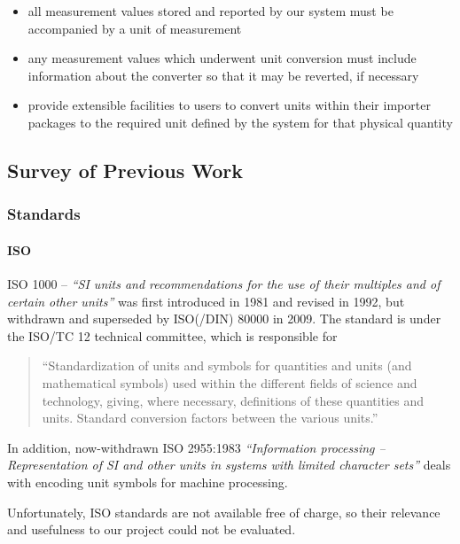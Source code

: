 \begin{itemize}
\tightlist
\item
  all measurement values stored and reported by our system must be
  accompanied by a unit of measurement
\item
  any measurement values which underwent unit conversion must include
  information about the converter so that it may be reverted, if
  necessary
\item
  provide extensible facilities to users to convert units within their
  importer packages to the required unit defined by the system for that
  physical quantity
\end{itemize}

\subsection{Survey of Previous Work}\label{survey-of-previous-work}

\subsubsection{Standards}\label{standards}

\paragraph{ISO}\label{iso}

ISO 1000 -- \emph{``SI units and recommendations for the use of their
multiples and of certain other units''} was first introduced in 1981 and
revised in 1992, but withdrawn and superseded by ISO(/DIN) 80000 in
2009. The standard is under the ISO/TC 12 technical committee, which is
responsible for

\begin{quote}
``Standardization of units and symbols for quantities and units (and
mathematical symbols) used within the different fields of science and
technology, giving, where necessary, definitions of these quantities and
units. Standard conversion factors between the various units.''
\end{quote}

In addition, now-withdrawn ISO 2955:1983 \emph{``Information processing
-- Representation of SI and other units in systems with limited
character sets''} deals with encoding unit symbols for machine
processing.

Unfortunately, ISO standards are not available free of charge, so their
relevance and usefulness to our project could not be evaluated.

